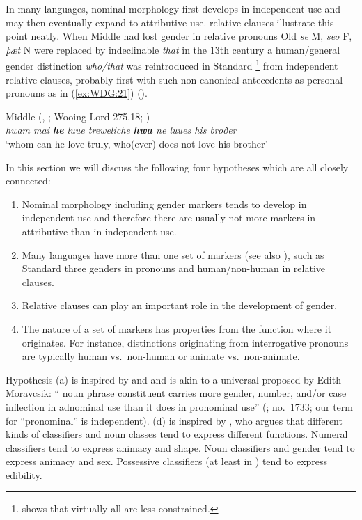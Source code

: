 \documentclass[output=collectionpaper]{langsci/langscibook}
\begin{document}
In many languages, nominal morphology first develops in independent use and may then eventually expand to attributive use.  relative clauses illustrate this point neatly. When Middle  had lost gender in relative pronouns \textendash{} Old  \textit{se} M, \textit{seo} F, \textit{þæt} N were replaced by indeclinable \textit{that} in the 13th century \textendash{} a human/general gender distinction \textit{who/that} was reintroduced in Standard %
\footnote{%
\cite{Herrmann2005} shows that virtually all  are less constrained.
} %
from independent relative clauses, probably first with such non-canonical antecedents as personal pronouns as in (\ref{ex:WDG:21}) (\citealt[91--93]{Fischer2000}).

\ea\label{ex:WDG:21}
Middle  (, ; Wooing Lord 275.18; \citealt{Fischer2000})\\
	\textit{hwam mai \textbf{he} luue treweliche \textbf{hwa} ne luues his broðer}\\
	`whom can he love truly, who(ever) does not love his brother' \\
\z

In this section we will discuss the following four hypotheses which are all closely connected:

\begin{enumerate}[label=(\alph*)]
\item Nominal morphology \textendash{} including gender markers \textendash{} tends to develop in independent use and therefore there are usually not more markers in attributive than in independent use.
\item Many languages have more than one set of markers (see also \citealt{Dahl2000}), such as Standard  three genders in pronouns and human/non-human in relative clauses.
\item Relative clauses can play an important role in the development of gender.
\item The nature of a set of markers has properties from the function where it originates. For instance, distinctions originating from interrogative pronouns are typically human vs.\ non-human or animate vs.\ non-animate.
\end{enumerate}

Hypothesis (a) is inspired by \cite{Lehmann1982} and \cite[233; based on ]{Heine1984} and is akin to a universal proposed by Edith Moravcsik: `` noun phrase constituent carries more gender, number, and/or case inflection in adnominal use than it does in pronominal use'' (\citealt{Moravcsik1994}; \citeauthor{UniArchive} no.~1733; our term for ``pronominal'' is independent). (d) is inspired by \cite{Croft1994}, who argues that different kinds of classifiers and noun classes tend to express different functions. Numeral classifiers tend to express animacy and shape. Noun classifiers and gender tend to express animacy and sex. Possessive classifiers (at least in ) tend to express edibility.
\end{document}
